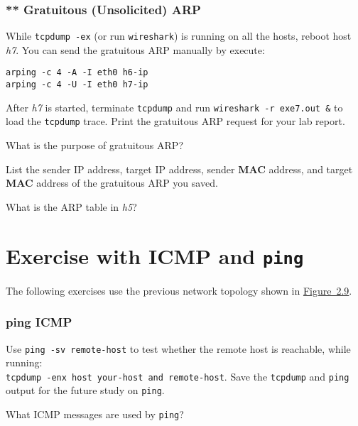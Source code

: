 \documentclass{../UTNetLab}
\begin{document}
\section{** Gratuitous (Unsolicited) ARP}
    While \lstinline{tcpdump -ex} (or run \lstinline{wireshark}) is running on all the hosts, reboot host \textit{h7}.
    You can send the gratuitous ARP manually by execute:

    \begin{lstlisting}[emph={eth0,h7-ip,h6-ip}]
arping -c 4 -A -I eth0 h6-ip
arping -c 4 -U -I eth0 h7-ip
    \end{lstlisting}

    After \textit{h7} is started, terminate \lstinline{tcpdump} and run \lstinline{wireshark -r exe7.out &} to load the \lstinline{tcpdump} trace.
    Print the gratuitous ARP request for your lab report.
    
    \begin{report}
    \item What is the purpose of gratuitous ARP?
 
    \item List the sender IP address, target IP address, sender \textbf{MAC} address, and target \textbf{MAC} address of the gratuitous ARP you saved.

    \item What is the ARP table in \textit{h5}?
    \end{report}


\part{Exercise with ICMP and \texttt{ping}}\label{sec:icmp-ping}
    The following exercises use the previous network topology shown in \hyperref[fig:2.9]{Figure~2.9}.

\section{ping ICMP}
    Use \lstinline[emph={remote-host}]{ping -sv remote-host} to test whether the remote host is reachable, while running:
    \\\lstinline[emph={your-host, remote-host}]{tcpdump -enx host your-host and remote-host}.
    Save the \lstinline{tcpdump} and \lstinline{ping} output for the future study on \lstinline{ping}.
    
    \begin{report}
    \item What ICMP messages are used by \lstinline{ping}?
    \end{report}
\end{document}
